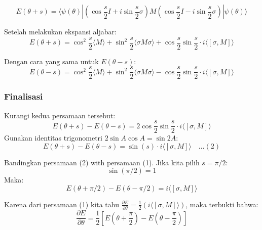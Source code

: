 \[E(\theta + s) = \langle \psi(\theta) | (\cos\frac{s}{2} I + i \sin\frac{s}{2} \sigma) M (\cos\frac{s}{2} I - i \sin\frac{s}{2} \sigma) | \psi(\theta) \rangle\]

Setelah melakukan ekspansi aljabar: \[E(\theta + s) = \cos^2\frac{s}{2} \langle M \rangle + \sin^2\frac{s}{2} \langle \sigma M \sigma \rangle + \cos\frac{s}{2}\sin\frac{s}{2} \cdot i \langle [\sigma, M] \rangle\]

Dengan cara yang sama untuk \(E(\theta - s)\): \[E(\theta - s) = \cos^2\frac{s}{2} \langle M \rangle + \sin^2\frac{s}{2} \langle \sigma M \sigma \rangle - \cos\frac{s}{2}\sin\frac{s}{2} \cdot i \langle [\sigma, M] \rangle\]

\hypertarget{c.-finalisasi}{%
\subsubsection{Finalisasi}\label{c.-finalisasi}}

Kurangi kedua persamaan tersebut: \[E(\theta + s) - E(\theta - s) = 2 \cos\frac{s}{2} \sin\frac{s}{2} \cdot i \langle [\sigma, M] \rangle\] Gunakan identitas trigonometri \(2\sin A \cos A = \sin 2A\): \[E(\theta + s) - E(\theta - s) = \sin(s) \cdot i \langle [\sigma, M] \rangle \quad \dots (2)\]

Bandingkan persamaan (2) with persamaan (1). Jika kita pilih \(s = \pi/2\): \[\sin(\pi/2) = 1\] Maka: \[E(\theta + \pi/2) - E(\theta - \pi/2) = i \langle [\sigma, M] \rangle\]

Karena dari persamaan (1) kita tahu \(\frac{\partial E}{\partial \theta} = \frac{1}{2} \left( i \langle [\sigma, M] \rangle \right)\), maka terbukti bahwa: \[\frac{\partial E}{\partial \theta} = \frac{1}{2} \left[ E\left(\theta + \frac{\pi}{2}\right) - E\left(\theta - \frac{\pi}{2}\right) \right]\]